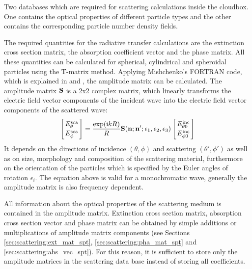 \label{sec:scattering:database}

Two databases which are required for scattering calculations
inside the cloudbox. One contains the optical properties of different
particle types and the other contains the corresponding particle
number density fields.

\label{sec:scattering:amp_mat_data}

The required quantities for the radiative transfer calculations are
the  extinction cross section matrix, the
absorption coefficient vector and the phase
matrix. All these quantities can be calculated for spherical,
cylindrical and spheroidal particles using the T-matrix
method. Applying Mishchenko's FORTRAN code, which is explained in
\citet{Mishchenko:98} and \citet{Mishchenko:00},   
the amplitude matrix can be calculated. The
amplitude matrix ${\bf S}$ is a 2x2 complex matrix, which linearly transforms 
the electric field vector components of the incident wave into the
electric field vector components of the scattered wave:  
\begin{eqnarray}
  \label{eq:ampl_matrix}
  \left[{E^{\rm sca}_{\theta}\atop E^{\rm sca}_{\phi}}\right] =
  \frac{\exp({\rm i} kR)}{R}{\bf S}({\bf n};{\bf
      n'};\epsilon_1,\epsilon_2,\epsilon_3)\left[{E^{\rm inc}_{\theta
          0}\atop E^{\rm inc}_{\phi 0}}\right] 
\end{eqnarray}
It depends on the directions of incidence  $(\theta,
\phi)$  and
scattering $(\theta', \phi')$ as  well as on size, morphology and composition of the
scattering material, furthermore on the orientation of the particles which
is specified by the Euler angles of rotation $\epsilon _i$. 
The equation above is valid for a monochromatic wave, generally the
amplitude matrix is also frequency dependent.

All information about the optical
properties of the scattering medium is contained in the amplitude
matrix. Extinction cross section
matrix, absorption cross section vector and phase matrix can be
obtained by simple additions or multiplications of amplitude matrix
components (see Sections
\ref{sec:scattering:ext_mat_spt}, \ref{sec:scattering:pha_mat_spt}  and
\ref{sec:scattering:abs_vec_spt}).
For this reason, it is sufficient to store only the amplitude matrices
in the scattering data base instead of storing all coefficients. 

